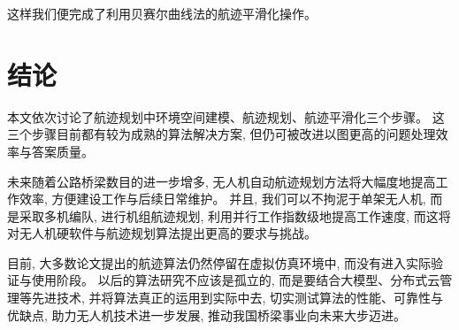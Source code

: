 \documentclass[12pt,a4paper,oneside,UTF8]{ctexart}
\begin{document}
这样我们便完成了利用贝赛尔曲线法的航迹平滑化操作。
\newpage\section{结论}
本文依次讨论了航迹规划中环境空间建模、航迹规划、航迹平滑化三个步骤。
这三个步骤目前都有较为成熟的算法解决方案,
但仍可被改进以图更高的问题处理效率与答案质量。

未来随着公路桥梁数目的进一步增多,
无人机自动航迹规划方法将大幅度地提高工作效率,
方便建设工作与后续日常维护。
并且,
我们可以不拘泥于单架无人机,
而是采取多机编队,
进行机组航迹规划,
利用并行工作指数级地提高工作速度,
而这将对无人机硬软件与航迹规划算法提出更高的要求与挑战。

目前,
大多数论文提出的航迹算法仍然停留在虚拟仿真环境中,
而没有进入实际验证与使用阶段。
以后的算法研究不应该是孤立的,
而是要结合大模型、分布式云管理等先进技术,
并将算法真正的运用到实际中去,
切实测试算法的性能、可靠性与优缺点,
助力无人机技术进一步发展,
推动我国桥梁事业向未来大步迈进。
\end{document}
